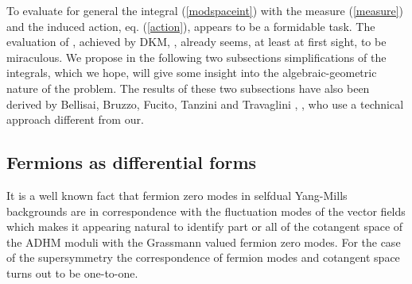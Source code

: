 \documentclass[a4paper,12pt]{article}
\begin{document}
To evaluate for general \coordHE{} the integral (\ref{modspaceint}) with 
the measure (\ref{measure}) and the induced action, eq. 
(\ref{action}), appears to be a formidable task. The evaluation 
of \coordHE{}, achieved by DKM, \cite{dorey1}, already seems, at 
least at first 
sight, to be miraculous. We propose in the following two 
subsections simplifications of the integrals, which we hope, will 
give some insight into the algebraic-geometric nature of the 
problem. The results of these two subsections have also 
been derived by Bellisai, Bruzzo, Fucito, Tanzini and Travaglini 
\cite{tanzini1}, \cite{tanzini2}, who use a technical approach different 
from our. 

\subsection{Fermions as differential forms}

It is a well known fact that fermion zero modes in selfdual Yang-Mills 
backgrounds are in correspondence with the fluctuation modes of the 
vector fields which makes it appearing natural to identify part or 
all of the cotangent space of the ADHM moduli with the Grassmann 
valued fermion zero modes. For 
the case of the \coordHE{} supersymmetry the correspondence of 
fermion modes and cotangent space turns out to be one-to-one. 
\end{document}
